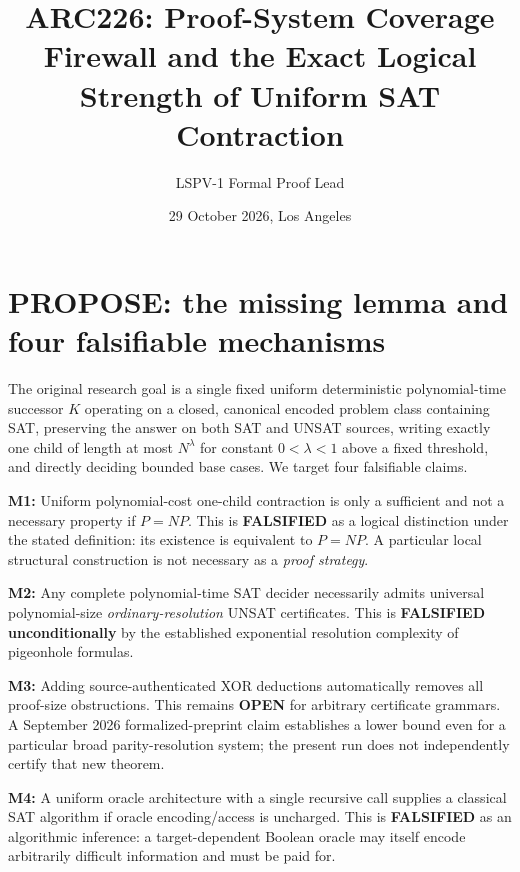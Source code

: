 \documentclass[11pt]{article}
\title{ARC226: Proof-System Coverage Firewall and the Exact Logical Strength of Uniform SAT Contraction}
\author{LSPV-1 Formal Proof Lead}
\date{29 October 2026, Los Angeles}
\begin{document}
\maketitle
\begin{center}\end{center}

\section{PROPOSE: the missing lemma and four falsifiable mechanisms}
The original research goal is a single fixed uniform deterministic polynomial-time successor $K$ operating on a closed, canonical encoded problem class containing SAT, preserving the answer on both SAT and UNSAT sources, writing exactly one child of length at most $N^\lambda$ for constant $0<\lambda<1$ above a fixed threshold, and directly deciding bounded base cases. We target four falsifiable claims.\par
\noindent\textbf{M1:} Uniform polynomial-cost one-child contraction is only a sufficient and not a necessary property if $P=NP$. This is \textbf{FALSIFIED} as a logical distinction under the stated definition: its existence is equivalent to $P=NP$. A particular local structural construction is not necessary as a \emph{proof strategy}.\par
\noindent\textbf{M2:} Any complete polynomial-time SAT decider necessarily admits universal polynomial-size \emph{ordinary-resolution} UNSAT certificates. This is \textbf{FALSIFIED unconditionally} by the established exponential resolution complexity of pigeonhole formulas.\par
\noindent\textbf{M3:} Adding source-authenticated XOR deductions automatically removes all proof-size obstructions. This remains \textbf{OPEN} for arbitrary certificate grammars. A September 2026 formalized-preprint claim establishes a lower bound even for a particular broad parity-resolution system; the present run does not independently certify that new theorem.\par
\noindent\textbf{M4:} A uniform oracle architecture with a single recursive call supplies a classical SAT algorithm if oracle encoding/access is uncharged. This is \textbf{FALSIFIED} as an algorithmic inference: a target-dependent Boolean oracle may itself encode arbitrarily difficult information and must be paid for.
\end{document}
